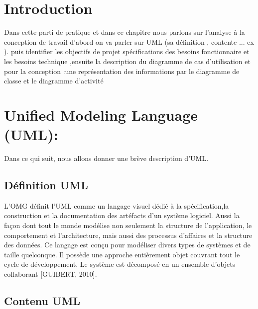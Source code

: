 

\section*{Introduction}





Dans cette parti de pratique et dans ce chapitre  nous parlons sur l'analyse à la conception de travail d'abord on va parler sur   UML  (sa définition , contente ... ex ). puis identifier les objectifs de projet  spécifications des besoins fonctionnaire et les besoins technique ,ensuite la description	 du  diagramme de cas d'utilisation  et pour la conception :une représentation des informations par le diagramme de classe et  le diagramme d'activité  



 \section{Unified Modeling Language (UML):}
 Dans ce qui suit, nous allons donner une brève description d’UML.
 \subsection{ Définition UML }
 L’OMG définit l’UML comme un langage visuel dédié à la spécification,la construction et la documentation des artéfacts d’un système logiciel. Aussi la façon dont tout le monde modélise non seulement la structure de l’application, le comportement et l’architecture, mais aussi des processus d’affaires et la structure des données. Ce langage est conçu pour modéliser divers types de systèmes et de taille quelconque. Il possède une approche entièrement objet couvrant tout le cycle de développement. Le système est décomposé en un ensemble d’objets collaborant [GUIBERT, 2010].
 
 \subsection{Contenu UML}
 
